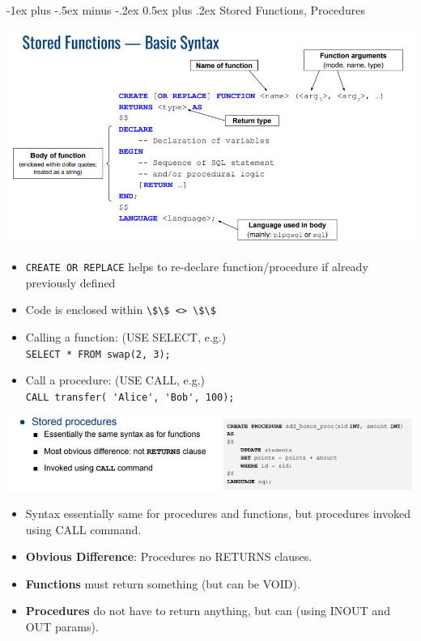 \documentclass[12pt, landscape]{article}
\makeatletter
\newcommand{\code}[1]{\colorbox{gray!25!}{\lstinline|#1|}}
\renewcommand{\section}{\@startsection{section}{1}{0mm}%
                                {-1ex plus -.5ex minus -.2ex}%
                                {0.5ex plus .2ex}%
                                {\normalfont\large\bfseries}}
\makeatother
\begin{document}
\begin{multicols*}{3}
\section{Stored Functions, Procedures}
\centerline{\includegraphics[width=1\linewidth]{functionbasicsyntax}}
\begin{itemize}
        \item \code{CREATE OR REPLACE} helps to re-declare function/procedure if already previously defined
        \item Code is enclosed within \code{\$\$ <> \$\$}
        \item Calling a function: (USE SELECT, e.g.) \\
        \code{SELECT * FROM swap(2, 3);}
        \item Call a procedure: (USE CALL, e.g.) \\
        \code{CALL transfer( 'Alice', 'Bob', 100);}
\end{itemize}

\centerline{\includegraphics[width=1 \linewidth]{storedprocedures}}
\begin{itemize}
\item Syntax essentially same for procedures and functions, but procedures invoked using CALL command.
\item \textbf{Obvious Difference}: Procedures no RETURNS clauses.
\item \textbf{Functions} must return something (but can be VOID).
\item \textbf{Procedures} do not have to return anything, but can (using INOUT and OUT params).
\end{itemize}


\end{multicols*}
\end{document}

